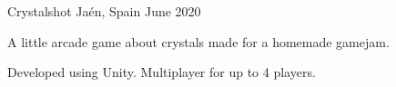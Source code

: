 \begin{cventries}
    \cventry
      {}
      {Crystalshot}
      {Jaén, Spain}
      {June 2020}
      {
        \begin{cvitems} %
          \item {A little arcade game about crystals made for a homemade gamejam.}
          \item {Developed using Unity. Multiplayer for up to 4 players.}
        \end{cvitems}
      }
\end{cventries}

